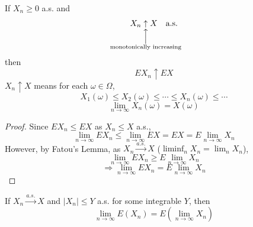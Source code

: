 \begin{reqnoproof}
\begin{theorem}
    If $X_n \geq 0$ a.s. and
    \[X_n \underset{\mathclap{\substack{\Big\uparrow\\ \text{monotonically increasing}}}}{\uparrow} X \quad \text{a.s.}\]
    then
    \[EX_n \uparrow EX\]
    $X_n \uparrow X$ means for each $\omega \in \Omega$,
    \[X_1(\omega) \leq X_2(\omega) \leq \cdots \leq X_n(\omega) \leq \cdots\]
    \[\lim_{n\to\infty} X_n(\omega) = X(\omega)\]
    \begin{proof}
        Since $EX_n \leq EX$ as $X_n \leq X$ a.s.,
        \[\lim_{n\to\infty} EX_n \leq \lim_{n\to\infty}EX = EX = E\lim_{n\to\infty}X_n\]
        However, by Fatou's Lemma, as $X_n \overset{a.s.}{\longrightarrow} X$ \quad ($\liminf_n X_n = \lim_n X_n$),
        \[\lim_{n\to\infty} EX_n \geq E\lim_{n\to\infty}X_n\]
        \[\Rightarrow \lim_{n\to\infty} EX_n = E\lim_{n\to\infty}X_n\]
    \end{proof}
\end{theorem}
\end{reqnoproof}

\begin{reqnoproof}
\begin{theorem}
    If $X_n \overset{a.s.}{\longrightarrow} X$ and $|X_n| \leq Y$ a.s. for some integrable $Y$, then
    \[\lim_{n\to\infty}E(X_n) = E(\lim_{n\to\infty}X_n)\]
\end{theorem}
\end{reqnoproof}